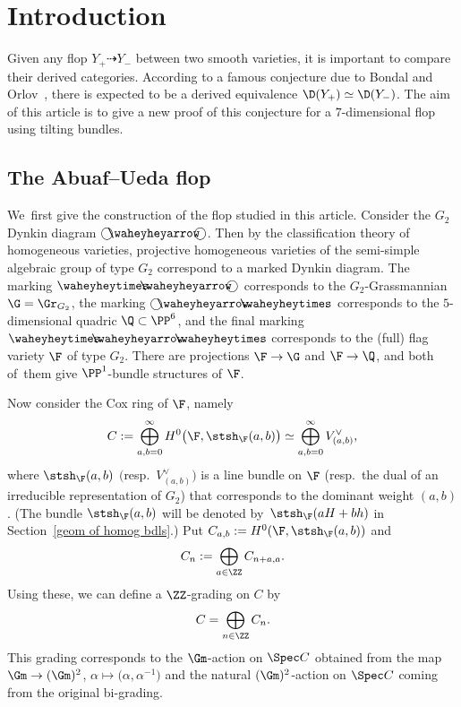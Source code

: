 \section{Introduction}

Given any flop $Y_+ \dashrightarrow Y_-$ between two smooth varieties,
it is important to compare their derived categories.
According to a famous conjecture due to Bondal and Orlov~\cite{BO02}, there is expected to be a derived equivalence $\D(Y_+) \simeq \D(Y_-)$.
The aim of this article is to give a new proof of this conjecture for a $7$-dimensional flop using tilting bundles.

\subsection{The Abuaf--Ueda flop}
We~first give the construction of the flop studied in this article.
Consider the $G_2$ Dynkin diagram $\bigcirc\hspace{-0.45em}\waheyheyarrow\hspace{-0.45em}\bigcirc$.
Then by the classification theory of homogeneous varieties, projective homogeneous varieties of the semi-simple algebraic group of type $G_2$
correspond to a marked Dynkin diagram.
The marking $\waheyheytimes\hspace{-0.7em}\waheyheyarrow\hspace{-0.45em}\bigcirc$ corresponds to the $G_2$-Grassmannian
$\G = \Gr_{G_2}$,
the marking $\bigcirc\hspace{-0.45em}\waheyheyarrow\hspace{-0.7em}\waheyheytimes$ corresponds to the $5$-dimensional quadric $\Q \subset \PP^6$,
and the final marking $\waheyheytimes\hspace{-0.7em}\waheyheyarrow\hspace{-0.7em}\waheyheytimes$
corresponds to the (full) flag variety $\F$ of type $G_2$.
There are projections $\F \to \G$ and $\F \to \Q$, and both of~them give $\PP^1$-bundle structures of $\F$.

Now consider the Cox ring of $\F$, namely
\begin{gather*}
C := \bigoplus_{a, b = 0}^{\infty} H^0\big(\F, \stsh_{\F}(a, b)\big) \simeq \bigoplus_{a, b = 0}^{\infty} V_{(a, b)}^{\vee},
\end{gather*}
where $\stsh_{\F}(a, b)$ $\big($resp.~$V_{(a, b)}^{\vee}\big)$ is a line bundle on $\F$ (resp.~the dual of an irreducible representation of $G_2$)
that corresponds to the dominant weight $(a, b)$.
(The bundle $\stsh_{\F}(a, b)$ will be denoted by~$\stsh_{\F}(aH + bh)$ in Section~\ref{geom of homog bdls}.)
Put $C_{a, b} := H^0(\F, \stsh_{\F}(a, b))$ and
\begin{gather*}
C_n := \bigoplus_{a \in \ZZ} C_{n + a, a}.
\end{gather*}
Using these, we can define a $\ZZ$-grading on $C$ by
\begin{gather*}
C = \bigoplus_{n \in \ZZ} C_n.
\end{gather*}
This grading corresponds to the $\Gm$-action on $\Spec C$ obtained from the map $\Gm \to (\Gm)^2$, $\alpha \mapsto \big(\alpha, \alpha^{-1}\big)$
and the natural $(\Gm)^2$-action on $\Spec C$ coming from the original bi-grading.

